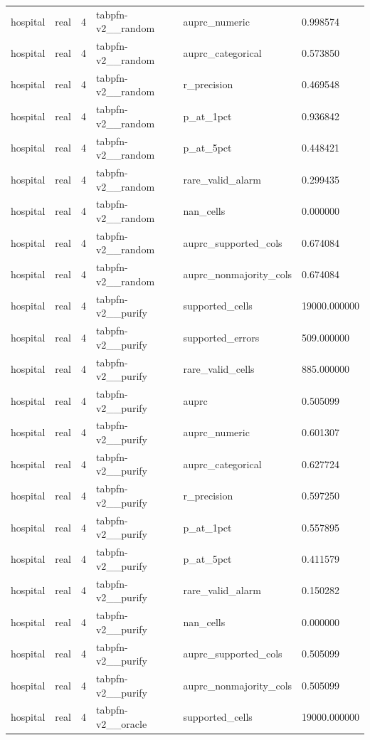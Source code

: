 \begin{tabular}{llllll}
hospital & real & 4 & tabpfn-v2\_\_random & auprc\_numeric & 0.998574 \\
hospital & real & 4 & tabpfn-v2\_\_random & auprc\_categorical & 0.573850 \\
hospital & real & 4 & tabpfn-v2\_\_random & r\_precision & 0.469548 \\
hospital & real & 4 & tabpfn-v2\_\_random & p\_at\_1pct & 0.936842 \\
hospital & real & 4 & tabpfn-v2\_\_random & p\_at\_5pct & 0.448421 \\
hospital & real & 4 & tabpfn-v2\_\_random & rare\_valid\_alarm & 0.299435 \\
hospital & real & 4 & tabpfn-v2\_\_random & nan\_cells & 0.000000 \\
hospital & real & 4 & tabpfn-v2\_\_random & auprc\_supported\_cols & 0.674084 \\
hospital & real & 4 & tabpfn-v2\_\_random & auprc\_nonmajority\_cols & 0.674084 \\
hospital & real & 4 & tabpfn-v2\_\_purify & supported\_cells & 19000.000000 \\
hospital & real & 4 & tabpfn-v2\_\_purify & supported\_errors & 509.000000 \\
hospital & real & 4 & tabpfn-v2\_\_purify & rare\_valid\_cells & 885.000000 \\
hospital & real & 4 & tabpfn-v2\_\_purify & auprc & 0.505099 \\
hospital & real & 4 & tabpfn-v2\_\_purify & auprc\_numeric & 0.601307 \\
hospital & real & 4 & tabpfn-v2\_\_purify & auprc\_categorical & 0.627724 \\
hospital & real & 4 & tabpfn-v2\_\_purify & r\_precision & 0.597250 \\
hospital & real & 4 & tabpfn-v2\_\_purify & p\_at\_1pct & 0.557895 \\
hospital & real & 4 & tabpfn-v2\_\_purify & p\_at\_5pct & 0.411579 \\
hospital & real & 4 & tabpfn-v2\_\_purify & rare\_valid\_alarm & 0.150282 \\
hospital & real & 4 & tabpfn-v2\_\_purify & nan\_cells & 0.000000 \\
hospital & real & 4 & tabpfn-v2\_\_purify & auprc\_supported\_cols & 0.505099 \\
hospital & real & 4 & tabpfn-v2\_\_purify & auprc\_nonmajority\_cols & 0.505099 \\
hospital & real & 4 & tabpfn-v2\_\_oracle & supported\_cells & 19000.000000 \\

\end{tabular}
